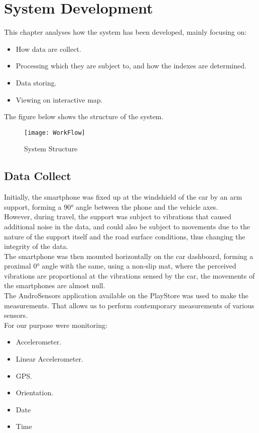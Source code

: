 \documentclass[tesi]{subfiles}
\begin{document}
\chapter{System Development}
\label{ch:System Development}
This chapter analyses how the system has been developed, mainly focusing on:

\begin{itemize}
\item How data are collect.
\item Processing which they are subject to, and how the indexes are determined.
\item Data storing.
\item Viewing on interactive map.
\end{itemize}

\noindent The figure below shows the structure of the system.


\begin{figure}[H]
\centering
\texttt{[image: WorkFlow]}
\caption{System Structure}

\end{figure}\label{fig:System Structure}

\section{Data Collect}\label{sc:Data Collect}
Initially, the smartphone was fixed up at the windshield of the car by an arm support, forming a $90°$ angle between the phone and the vehicle axes.\\
However, during travel, the support was subject to vibrations that caused additional noise in the data, and could also be subject to movements due to the nature of the support itself and the road surface conditions, thus changing the integrity of the data.\\
The smartphone was then mounted horizontally on the car dashboard, forming a proximal $0°$ angle with the same, using a non-slip mat, where the perceived vibrations are proportional at the vibrations sensed by the car, the movements of the smartphones are almost null.\\
The AndroSensors application available on the PlayStore was used to make the measurements. That allows us to perform contemporary measurements of various sensors.\\
For our purpose were monitoring:

\begin{itemize}
\item Accelerometer.
\item Linear Accelerometer.
\item GPS.
\item Orientation.
\item Date
\item Time
\end{itemize}
\end{document}
